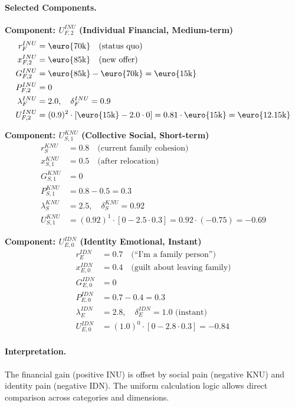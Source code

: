 \paragraph{Selected Components.}

\textbf{Component: $U^{INU}_{F,2}$ (Individual Financial, Medium-term)}
\begin{align*}
r^{INU}_F &= \text{\euro{70k}} \quad \text{(status quo)} \\
x^{INU}_{F,2} &= \text{\euro{85k}} \quad \text{(new offer)} \\
G^{INU}_{F,2} &= \text{\euro{85k}} - \text{\euro{70k}} = \text{\euro{15k}} \\
P^{INU}_{F,2} &= 0 \\
\lambda^{INU}_F &= 2.0, \quad \delta^{INU}_F = 0.9 \\
U^{INU}_{F,2} &= (0.9)^2 \cdot [\text{\euro{15k}} - 2.0 \cdot 0] = 0.81 \cdot \text{\euro{15k}} = \text{\euro{12.15k}}
\end{align*}

\textbf{Component: $U^{KNU}_{S,1}$ (Collective Social, Short-term)}
\begin{align*}
r^{KNU}_S &= 0.8 \quad \text{(current family cohesion)} \\
x^{KNU}_{S,1} &= 0.5 \quad \text{(after relocation)} \\
G^{KNU}_{S,1} &= 0 \\
P^{KNU}_{S,1} &= 0.8 - 0.5 = 0.3 \\
\lambda^{KNU}_S &= 2.5, \quad \delta^{KNU}_S = 0.92 \\
U^{KNU}_{S,1} &= (0.92)^1 \cdot [0 - 2.5 \cdot 0.3] = 0.92 \cdot (-0.75) = -0.69
\end{align*}

\textbf{Component: $U^{IDN}_{E,0}$ (Identity Emotional, Instant)}
\begin{align*}
r^{IDN}_E &= 0.7 \quad \text{(``I'm a family person'')} \\
x^{IDN}_{E,0} &= 0.4 \quad \text{(guilt about leaving family)} \\
G^{IDN}_{E,0} &= 0 \\
P^{IDN}_{E,0} &= 0.7 - 0.4 = 0.3 \\
\lambda^{IDN}_E &= 2.8, \quad \delta^{IDN}_E = 1.0 \text{ (instant)} \\
U^{IDN}_{E,0} &= (1.0)^0 \cdot [0 - 2.8 \cdot 0.3] = -0.84
\end{align*}

\paragraph{Interpretation.}
The financial gain (positive INU) is offset by social pain (negative KNU)
and identity pain (negative IDN). The uniform calculation logic allows
direct comparison across categories and dimensions.

